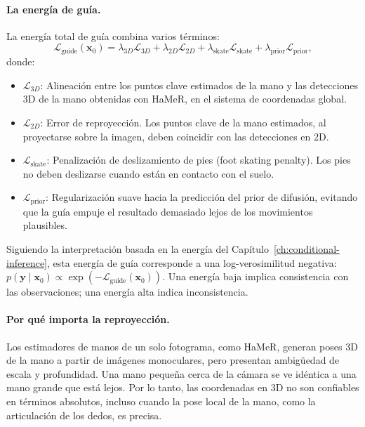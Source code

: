 \documentclass[../../book-main_es.tex]{subfiles}
\begin{document}
\paragraph{La energía de guía.}
La energía total de guía combina varios términos:
\begin{equation}
    \mathcal{L}_{\text{guide}}(\boldsymbol{x}_0) =
    \lambda_{3D}\mathcal{L}_{3D} + \lambda_{2D}\mathcal{L}_{2D} +
    \lambda_{\text{skate}}\mathcal{L}_{\text{skate}} +
    \lambda_{\text{prior}}\mathcal{L}_{\text{prior}},
\end{equation}
donde:
\begin{itemize}
    \item $\mathcal{L}_{3D}$: Alineación entre los puntos clave estimados de la mano
        y las detecciones 3D de la mano obtenidas con HaMeR, en el sistema de coordenadas global.
    \item $\mathcal{L}_{2D}$: Error de reproyección. Los puntos clave de la mano estimados,
        al proyectarse sobre la imagen, deben coincidir con las detecciones en 2D.
    \item $\mathcal{L}_{\text{skate}}$: Penalización de deslizamiento de pies (foot skating penalty). Los pies
        no deben deslizarse cuando están en contacto con el suelo.
    \item $\mathcal{L}_{\text{prior}}$: Regularización suave hacia
        la predicción del prior de difusión, evitando que la guía
        empuje el resultado demasiado lejos de los movimientos plausibles.
\end{itemize}

Siguiendo la interpretación basada en la energía del
Capítulo~\ref{ch:conditional-inference}, esta energía de guía
corresponde a una log-verosimilitud negativa: $p(\boldsymbol{y} \mid
\boldsymbol{x}_0) \propto \exp(-\mathcal{L}_{\text{guide}}(\boldsymbol{x}_0))$. Una
energía baja implica consistencia con las observaciones; una energía alta indica inconsistencia.

\paragraph{Por qué importa la reproyección.}
Los estimadores de manos de un solo fotograma, como HaMeR, generan poses 3D de la mano a partir de
imágenes monoculares, pero presentan ambigüedad de escala y profundidad. Una mano pequeña
cerca de la cámara se ve idéntica a una mano grande que está lejos. Por lo tanto, las
coordenadas en 3D no son confiables en términos absolutos, incluso cuando
la pose local de la mano, como la articulación de los dedos, es precisa.
\end{document}
